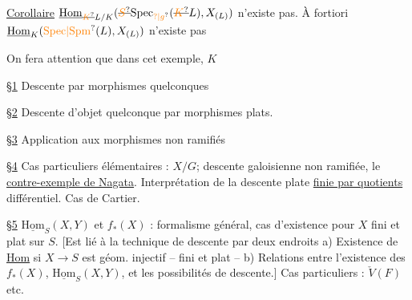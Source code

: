 
\uline{Corollaire} $\underline{\mathrm{Hom}}_{\deleted{\unsure{K}}L/K}(\deleted{\unsure{S}}\mathrm{Spec}_{\unsure{?|g}}(\deleted{\unsure{K}}L),X_{(L)})$ n'existe pas. À fortiori $\underline{\mathrm{Hom}}_K(\unsure{\mathrm{Spec}|\mathrm{Spm}}(L),X_{(L)})$ n'existe pas

On fera attention que dans cet exemple, $K$



\uline{\S1} Descente  par morphismes quelconques


\uline{\S2} Descente d'objet quelconque par morphismes plats.

\uline{\S3} Application  aux morphismes non ramifiés

\uline{\S4} Cas particuliers élémentaires :  $X/G$; descente galoisienne non ramifiée, le \uline{contre-exemple de Nagata}. Interprétation de la descente plate \uline{finie par quotients}  différentiel. Cas de Cartier.



\uline{\S5} $\underline{\mathrm{Hom}}_S(X,Y)$ et $f_*(X)$ : formalisme général, cas d'existence pour $X$ fini et plat sur $S$. [Est lié à la technique de descente  par deux endroits a) Existence de \uline{Hom} si $X\to S$ est géom. injectif -- fini et plat -- b) Relations entre l'existence des $f_*(X)$, $\underline{\mathrm{Hom}}_S(X,Y)$, et les possibilités de descente.] Cas particuliers : $\check{V}(F)$ etc.

